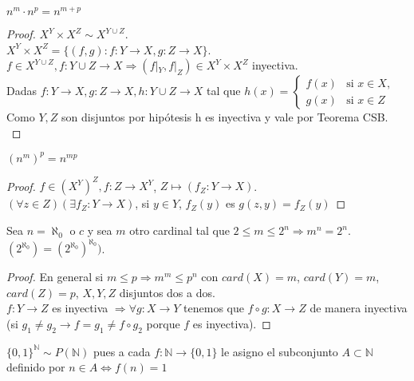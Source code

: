 \begin{prop}
    $n^m \cdot n^p = n^{m+p}$ \\ 
    \begin{proof}
        $X^Y \times X^Z \sim X^{Y \cup Z}$. \\
        $X^Y \times X^Z = \{ (f, g) : f: Y \to X, g: Z \to X \}$. \\
        $f \in X^{Y \cup Z}, f: Y \cup Z \to X \Rightarrow (f|_Y, f|_Z) \in X^Y \times X^Z$ inyectiva. \\
        Dadas $f: Y \to X, g: Z \to X, h: Y \cup Z \to X$ tal que $h(x) = \begin{cases}
          f(x) & \text{si } x \in X, \\
          g(x) & \text{si } x \in Z
        \end{cases}$ \\
        Como $Y, Z$ son disjuntos por hipótesis h es inyectiva y vale por Teorema CSB. \\
    \end{proof}
\end{prop}

\begin{prop}
  $(n^m)^p = n^{mp}$
  \begin{proof}
    $f \in (X^Y)^Z, f: Z \to X^Y$, $Z \mapsto (f_Z: Y \to X)$. \\
    $(\forall z \in Z)(\exists f_Z: Y \to X)$, si $y \in Y$, $f_Z(y)$ es $g(z, y) = f_Z(y)$ 
  \end{proof}
\end{prop}

\begin{theorem}
  Sea $n = \aleph_0$ o $c$ y sea $m$ otro cardinal tal que $2 \leq m \leq 2^n \Rightarrow m^n = 2^n$. $(2^{\aleph_0}) = (2^{\aleph_0})^{\aleph_0})$.
  \begin{proof}
  En general si $m \leq p \Rightarrow m^m \leq p^n$ con $card(X) = m$, $card(Y) = m$, $card(Z) = p$, $X,Y,Z$ disjuntos dos a dos. \\
    $f: Y \to Z$ es inyectiva $\Rightarrow \forall g: X \to Y$ tenemos que $f \circ g: X \to Z$ de manera inyectiva (si $g_1 \neq g_2 \to f = g_1 \neq f \circ g_2$ porque $f$ es inyectiva).
  \end{proof}
\end{theorem}

\begin{note}
  $\{ 0, 1 \}^\mathbb{N} \sim P(\mathbb{N})$ pues a cada $f: \mathbb{N} \to \{0, 1\}$ le asigno el subconjunto $A \subset \mathbb{N}$ definido por $n \in A \iff f(n) = 1$
\end{note}
  
